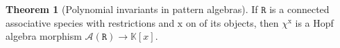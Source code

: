 \documentclass[submission]{FPSAC2023}
\theoremstyle{definition}
\newtheorem{thm}{Theorem}[section]
\newtheorem{lm}[thm]{Lemma}
\DeclareMathOperator{\pat}{\mathbf{pat}}
\newcommand{\xx}{\mathrm{x}}
\newcommand{\yy}{\mathrm{y}}
\begin{document}
\begin{thm}[Polynomial invariants in pattern algebras]\label{thm:polynomiality}
If $\mathtt{R}$ is a connected associative species with restrictions and $\mathrm{x}$ on of its objects, then $\chi^{\mathrm{x}}$ is a Hopf algebra morphism $\mathcal A(\mathtt{R}) \to \mathbb{K}[x]$.
\end{thm}

\end{document}
